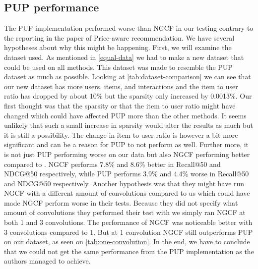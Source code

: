 \subsection{PUP performance}
The PUP implementation performed worse than NGCF in our testing contrary to the reporting in the paper of Price-aware recommendation\cite{Priceaware}.
We have several hypotheses about why this might be happening.
First, we will examine the dataset used.
As mentioned in \autoref{equal-data} we had to make a new dataset that could be used on all methods.
This dataset was made to resemble the PUP dataset as much as possible.
Looking at \autoref{tab:dataset-comparison} we can see that our new dataset has more users, items, and interactions and the item to user ratio has dropped by about 10\% but the sparsity only increased by 0.0013\%.
Our first thought was that the sparsity or that the item to user ratio might have changed which could have affected PUP more than the other methods.
It seems unlikely that such a small increase in sparsity would alter the results as much but it is still a possibility.
The change in item to user ratio is however a bit more significant and can be a reason for PUP to not perform as well.
Further more, it is not just PUP performing worse on our data but also NGCF performing better compared to \cite{Priceaware}.
NGCF performs 7.8\% and 8.6\% better in Recall@50 and NDCG@50 respectively, while PUP performs 3.9\% and 4.4\% worse in Recall@50 and NDCG@50 respectively.
Another hypothesis was that they might have run NGCF with a different amount of convolutions compared to us which could have made NGCF perform worse in their tests.
Because they did not specify what amount of convolutions they performed their test with we simply ran NGCF at both 1 and 3 convolutions.
The performance of NGCF was noticeable better with 3 convolutions compared to 1.
But at 1 convolution NGCF still outperforms PUP on our dataset, as seen on \autoref{tab:one-convolution}.
In the end, we have to conclude that we could not get the same performance from the PUP implementation as the authors managed to achieve.
